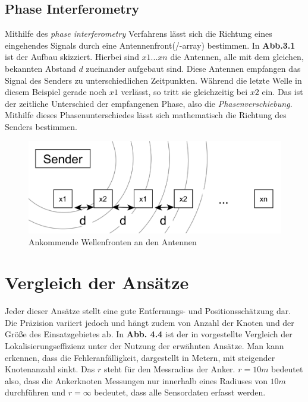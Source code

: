 \documentclass[12pt, a4wide]{scrreprt}
\begin{document}
    \subsection{Phase Interferometry}
Mithilfe des \textit{phase interferometry}\cite{q1} Verfahrens lässt sich die Richtung eines eingehendes Signals durch eine Antennenfront(/-array) bestimmen. In {\bf Abb.3.1} ist der Aufbau skizziert. Hierbei sind $x1...xn$ die Antennen, alle mit dem gleichen, bekannten Abstand $d$ zueinander aufgebaut sind. Diese Antennen empfangen das Signal des Senders zu unterschiedlichen Zeitpunkten. Während die letzte Welle in diesem Beispiel gerade noch $x1$ verlässt, so tritt sie gleichzeitig bei $x2$ ein. Das ist der zeitliche Unterschied der empfangenen Phase, also die \textit{Phasenverschiebung}. Mithilfe dieses Phasenunterschiedes lässt sich mathematisch die Richtung des Senders bestimmen.\\

\begin{figure}[!htb]
\centering
\includegraphics[scale=.27]{phase_int2.png}
\caption{Ankommende Wellenfronten an den Antennen}
\end{figure}

\section{Vergleich der Ansätze}
Jeder dieser Ansätze stellt eine gute Entfernungs- und Positionsschätzung dar. Die Präzision variiert jedoch und hängt zudem von Anzahl der Knoten und der Größe des Einsatzgebietes ab. In {\bf Abb. 4.4} ist der in \cite{patwari_locating} vorgestellte Vergleich der Lokalisierungseffizienz unter der Nutzung der erwähnten Ansätze. Man kann erkennen, dass die Fehleranfälligkeit, dargestellt in Metern, mit steigender Knotenanzahl sinkt. Das $r$ steht für den Messradius der Anker. $r = 10m$ bedeutet also, dass die Ankerknoten Messungen nur innerhalb eines Radiuses von $10m$ durchführen und $r = \infty$ bedeutet, dass alle Sensordaten erfasst werden.
\end{document}
